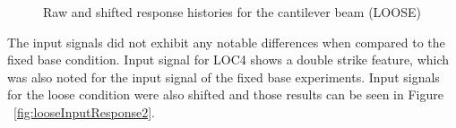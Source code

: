 \documentclass[paper=a4, fontsize=12pt]{scrartcl} %
\begin{document}
	\begin{figure}[H]
		\centering
		\quad
		\caption{Raw and shifted response histories for the cantilever beam (LOOSE)}
		\label{fig:looseTimeResponse}
	\end{figure}
%
The input signals did not exhibit any notable differences when compared to the fixed base condition. Input signal for LOC4 shows a double strike feature, which was also noted for the input signal of the fixed base experiments. Input signals for the loose condition were also shifted and those results can be seen in Figure ~\ref{fig:looseInputResponse2}.
%
\end{document}
